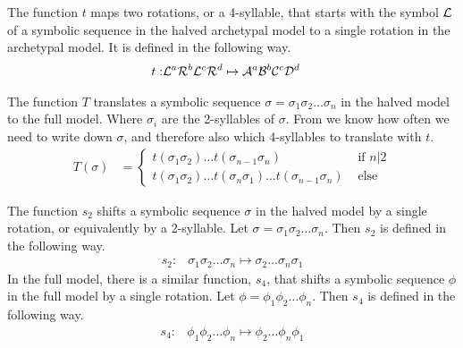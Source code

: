 \begin{definition}
	\label{def:t}
	The function $t$ maps two rotations, or a 4-syllable, that starts with the symbol $\mathcal{L}$ of a symbolic sequence in the halved archetypal model to a single rotation in the archetypal model.
	It is defined in the following way.
	\begin{align}
		t: & \mathcal{L}^a\mathcal{R}^b\mathcal{L}^c\mathcal{R}^d \mapsto \mathcal{A}^a\mathcal{B}^b\mathcal{C}^c\mathcal{D}^d
	\end{align}
\end{definition}

\begin{definition}
	\label{def:T}
	The function $T$ translates a symbolic sequence $\sigma = \sigma_1\sigma_2 \dots \sigma_n$ in the halved model to the full model.
	Where $\sigma_i$ are the 2-syllables of $\sigma$.
	From  we know how often we need to write down $\sigma$, and therefore also which 4-syllables to translate with $t$.
	\begin{align}
		T(\sigma) & = \begin{cases}
			              t(\sigma_1\sigma_2) \dots t(\sigma_{n-1}\sigma_n)                           & \text{ if } n | 2 \\
			              t(\sigma_1\sigma_2) \dots t(\sigma_n\sigma_1) \dots t(\sigma_{n-1}\sigma_n) & \text{ else }
		              \end{cases}
	\end{align}
\end{definition}

\begin{definition}
	The function $s_2$ shifts a symbolic sequence $\sigma$ in the halved model by a single rotation, or equivalently by a 2-syllable.
	Let $\sigma = \sigma_1\sigma_2 \dots \sigma_n$.
	Then $s_2$ is defined in the following way.
	\begin{align}
		s_2: & \sigma_1\sigma_2 \dots \sigma_n \mapsto \sigma_2 \dots \sigma_n\sigma_1
	\end{align}
	In the full model, there is a similar function, $s_4$, that shifts a symbolic sequence $\phi$ in the full model by a single rotation.
	Let $\phi = \phi_1\phi_2 \dots \phi_n$.
	Then $s_4$ is defined in the following way.
	\begin{align}
		s_4: & \phi_1\phi_2 \dots \phi_n \mapsto \phi_2 \dots \phi_n\phi_1
	\end{align}
\end{definition}

